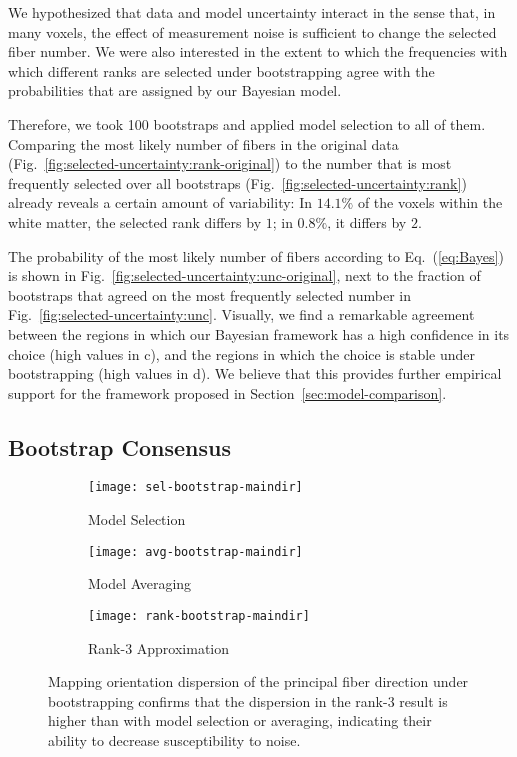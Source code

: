 We hypothesized that data and model uncertainty interact in the sense that, in many voxels, the effect of measurement noise is sufficient to change the selected fiber number. We were also interested in the extent to which the frequencies with which different ranks are selected under bootstrapping agree with the probabilities that are assigned by our Bayesian model.

Therefore, we took 100 bootstraps and applied model
selection to all of them. Comparing the most
likely number of fibers in the original data (Fig.~\ref{fig:selected-uncertainty:rank-original}) to the number that is most frequently selected over all bootstraps (Fig.~\ref{fig:selected-uncertainty:rank}) already reveals a certain amount of variability: In $14.1\%$ of the voxels within the white matter, the selected rank differs
by $1$; in $0.8\%$, it differs by $2$.

The probability of the most likely number of fibers according to Eq.~(\ref{eq:Bayes}) is
shown in Fig.~\ref{fig:selected-uncertainty:unc-original}, next to the fraction of bootstraps that agreed on the most frequently selected number in Fig.~\ref{fig:selected-uncertainty:unc}. Visually, we find a remarkable agreement between the regions in which our Bayesian framework has a high confidence in its choice (high values in c), and the regions in which the choice is stable under bootstrapping (high values in d). We believe that this provides further empirical support for the framework proposed in Section~\ref{sec:model-comparison}.

\subsection{Bootstrap Consensus}
\label{sec:bootstrap-consensus}
\begin{figure*}[t]
	\centering
	\begin{subfigure}[b]{0.32\linewidth}
		\texttt{[image: sel-bootstrap-maindir]}
		\caption{Model Selection}
		
	\end{subfigure}
        \hspace{0.01\linewidth}
	\begin{subfigure}[b]{0.32\linewidth}
		\texttt{[image: avg-bootstrap-maindir]}
		\caption{Model Averaging}
	\end{subfigure}
        \hspace{0.01\linewidth}
	\begin{subfigure}[b]{0.32\linewidth}
		\texttt{[image: rank-bootstrap-maindir]}
		\caption{Rank-3 Approximation}
	\end{subfigure}

	\caption{Mapping orientation dispersion of the principal fiber
		direction under bootstrapping confirms that the dispersion in the rank-$3$
result is higher than with model selection or averaging, indicating their ability to decrease susceptibility to noise.}
	\label{fig:dispersion}
\end{figure*}

